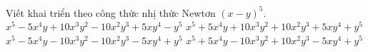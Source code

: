 \begin{ex}%
	Viết khai triển theo công thức nhị thức  Newtơn $(x-y)^5$.
	 \choice
		{\True  $x^5-5x^4y+10x^3y^2-10x^2y^3+5xy^4-y^5$}
		{$x^5+5x^4y+10x^3y^2+10x^2y^3+5xy^4+y^5$} 
		{$x^5-5x^4y-10x^3y^2-10x^2y^3-5xy^4+y^5$} 
		 {$x^5+5x^4y-10x^3y^2+10x^2y^3-5xy^4+y^5$}
\end{ex}
